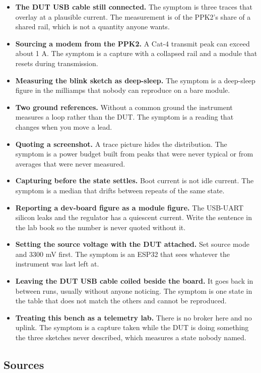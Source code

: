 \begin{itemize}
\item \textbf{The DUT USB cable still connected.} The symptom is three traces that overlay
at a plausible current. The measurement is of the PPK2's share of a shared rail, which is
not a quantity anyone wants.
\item \textbf{Sourcing a modem from the PPK2.} A Cat-4 transmit peak can exceed about 1 A.
The symptom is a capture with a collapsed rail and a module that resets during transmission.
\item \textbf{Measuring the blink sketch as deep-sleep.} The symptom is a deep-sleep figure
in the milliamps that nobody can reproduce on a bare module.
\item \textbf{Two ground references.} Without a common ground the instrument measures a
loop rather than the DUT. The symptom is a reading that changes when you move a lead.
\item \textbf{Quoting a screenshot.} A trace picture hides the distribution. The symptom is
a power budget built from peaks that were never typical or from averages that were never
measured.
\item \textbf{Capturing before the state settles.} Boot current is not idle current. The
symptom is a median that drifts between repeats of the same state.
\item \textbf{Reporting a dev-board figure as a module figure.} The USB-UART silicon leaks
and the regulator has a quiescent current. Write the sentence in the lab book so the number
is never quoted without it.
\item \textbf{Setting the source voltage with the DUT attached.} Set source mode and
3300 mV first. The symptom is an ESP32 that sees whatever the instrument was last left at.
\item \textbf{Leaving the DUT USB cable coiled beside the board.} It goes back in between
runs, usually without anyone noticing. The symptom is one state in the table that does not
match the others and cannot be reproduced.
\item \textbf{Treating this bench as a telemetry lab.} There is no broker here and no
uplink. The symptom is a capture taken while the DUT is doing something the three sketches
never described, which measures a state nobody named.
\end{itemize}

\subsection*{Sources}

